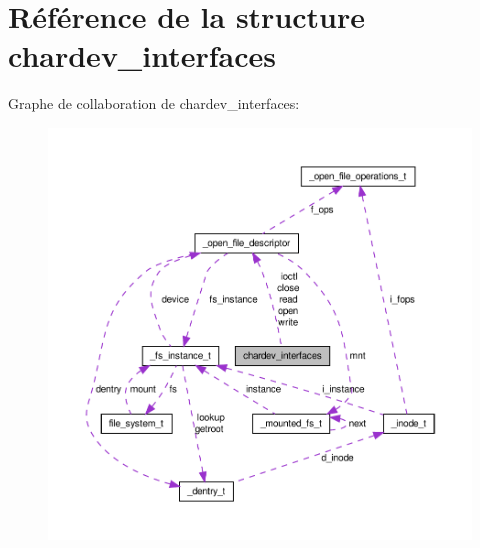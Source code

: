 \hypertarget{structchardev__interfaces}{\section{Référence de la structure chardev\-\_\-interfaces}
\label{structchardev__interfaces}
}


Graphe de collaboration de chardev\-\_\-interfaces\-:
\nopagebreak
\begin{figure}[H]
\begin{center}
\leavevmode
\includegraphics[width=350pt]{structchardev__interfaces__coll__graph}
\end{center}
\end{figure}
